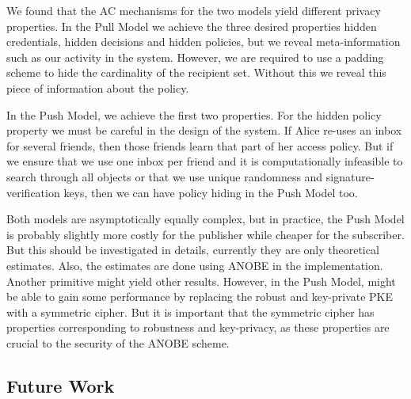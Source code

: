 We found that the \ac{AC} mechanisms for the two models yield different privacy 
properties.
In the Pull Model we achieve the three desired properties hidden credentials, 
hidden decisions and hidden policies, but we reveal meta-information such as 
our activity in the system.
However, we are required to use a padding scheme to hide the cardinality of the 
recipient set.
Without this we reveal this piece of information about the policy.

In the Push Model, we achieve the first two properties.
For the hidden policy property we must be careful in the design of the system.
If Alice re-uses an inbox for several friends, then those friends learn that 
part of her access policy.
But if we ensure that we use one inbox per friend and it is computationally 
infeasible to search through all objects or that we use unique randomness and 
signature-verification keys, then we can have policy hiding in the Push Model 
too.

Both models are asymptotically equally complex, but in practice, the Push Model 
is probably slightly more costly for the publisher while cheaper for the 
subscriber.
But this should be investigated in details, currently they are only theoretical 
estimates.
Also, the estimates are done using \ac{ANOBE} in the implementation.
Another primitive might yield other results.
However, in the Push Model, might be able to gain some performance by replacing 
the robust and key-private \ac{PKE} with a symmetric cipher.
But it is important that the symmetric cipher has properties corresponding to 
robustness and key-privacy, as these properties are crucial to the security of 
the \ac{ANOBE} scheme.

\subsection{Future Work}


